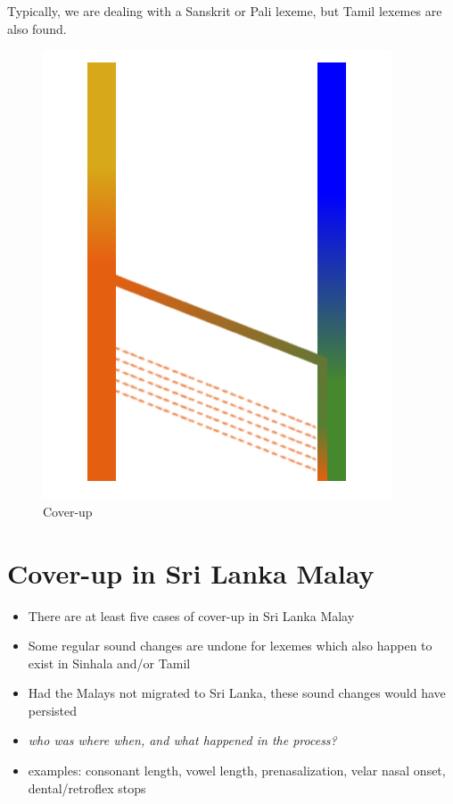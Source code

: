 \documentclass[a4paper,10pt]{article}
\begin{document}
Typically, we are dealing with a Sanskrit or Pali lexeme, but Tamil lexemes are also found. 


\begin{figure}
\centering
    \includegraphics[height=.3\textheight]{coverup.png}
 \caption{Cover-up}
\label{fig:coverup}
\end{figure}


    

\section{Cover-up in Sri Lanka Malay}
 
\begin{itemize}
 \item  There are at least five cases of cover-up in Sri Lanka Malay
 \item Some regular sound changes are undone for lexemes which also happen to exist in Sinhala and/or Tamil
 \item Had the Malays not migrated to Sri Lanka, these sound changes would have persisted
 \item \em who was where when, and what happened in the process?\em
 \item examples: consonant length, vowel length, prenasalization, velar nasal onset, dental/retroflex stops 
\end{itemize}  
\end{document}
